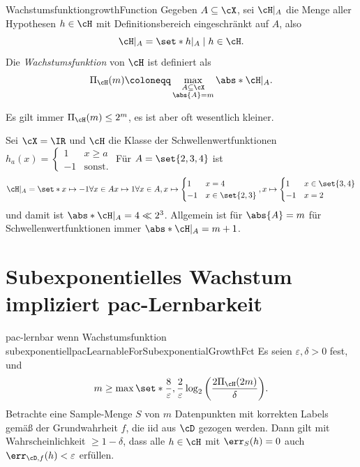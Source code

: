 \documentclass[language=ngerman,algolist,acrolist]{TemplateLecture}
\begin{document}
\begin{defi}{Wachstumsfunktion}{growthFunction}
    Gegeben $A \subseteq \cX$, sei $\cH|_A$ die Menge aller Hypothesen $h \in \cH$ mit Definitionsbereich eingeschränkt auf $A$, also
    \begin{equation*}
        \cH|_A = \set*{h|_A \mid h \in \cH}.
    \end{equation*}
    Die \emph{Wachstumsfunktion} von $\cH$ ist definiert als 
    \begin{equation*}
        \Pi_\cH(m) \coloneqq \max_{\substack{A \subseteq \cX \\ \abs{A} = m}} \abs*{\cH|_A}.
    \end{equation*}
\end{defi}
Es gilt immer $\Pi_\cH(m) \leq 2^m$, es ist aber oft wesentlich kleiner.
\begin{expl}
    Sei $\cX = \IR$ und $\cH$ die Klasse der Schwellenwertfunktionen $h_a(x) = \begin{cases}
        1 & x \geq a \\ -1 & \text{sonst}.
    \end{cases}$ Für $A = \set{2,3,4}$ ist 
    \begin{equation*}
        \cH|_A = \set*{x \mapsto -1 \forall x \in A x \mapsto 1 \forall x \in A, x \mapsto \begin{cases}
            1 & x = 4 \\ -1 & x \in \set{2,3}
        \end{cases}, x \mapsto \begin{cases}
            1 & x \in \set{3,4} \\ -1 & x = 2
        \end{cases}}
    \end{equation*}
    und damit ist $\abs*{\cH|_A} = 4 \ll 2^3$. Allgemein ist für $\abs{A} = m$ für Schwellenwertfunktionen immer $\abs*{\cH|_A} = m + 1$.
\end{expl}
\section{Subexponentielles Wachstum impliziert \acs{pac}-Lernbarkeit}

\begin{thm}{\ac{pac}-lernbar wenn Wachstumsfunktion subexponentiell}{pacLearnableForSubexponentialGrowthFct}
    Es seien $\varepsilon, \delta > 0$ fest, und 
    \begin{equation}
        m \geq \max\set*{\frac{8}{\varepsilon}, \frac{2}{\varepsilon}\log_2\left( \frac{2\Pi_\cH(2m)}{\delta} \right)}.\label{eq:pacLearnableForSubexponentialGrowthFct}
    \end{equation}
    Betrachte eine Sample-Menge $S$ von $m$ Datenpunkten mit korrekten Labels gemäß der Grundwahrheit $f$, die \ac{iid} aus $\cD$ gezogen werden. Dann gilt mit Wahrscheinlichkeit $\geq 1 - \delta$, dass alle $h \in \cH$ mit $\err_S(h) = 0$ auch $\err_{\cD, f}(h) < \varepsilon$ erfüllen.
\end{thm}
\end{document}
